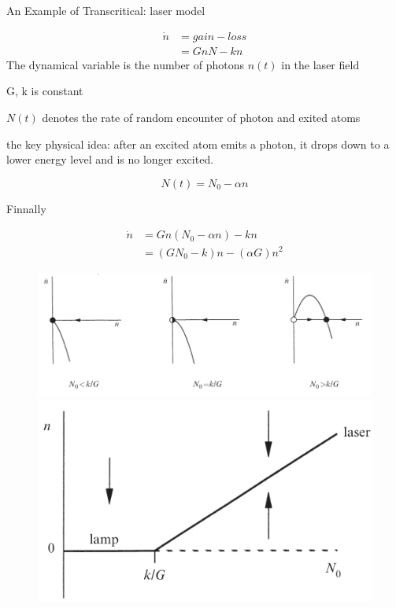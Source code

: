 \documentclass[9pt,aspectratio=43,mathserif,table]{beamer}
\begin{document}
\begin{frame}{An Example of Transcritical: laser model}

  \begin{multicols}{2}
    \begin{equation}
      \begin{aligned}
        \dot n &= gain - loss \\
               &= GnN - kn 
      \end{aligned}
    \end{equation}
    The dynamical variable is the number of photons $n ( t )$ in the laser field

    G, k is constant

    $N(t)$ denotes the rate of random encounter of photon and exited atoms

    the key physical idea: after an excited atom emits a photon, it
    drops down to a lower energy level and is no longer excited. 

    $$N(t) = N_0 - \alpha n$$

    Finnally 

    \begin{equation}
      \begin{aligned}
        \dot n &= Gn(N_0 - \alpha n) - k n \\
               &= (GN_0 - k) n - (\alpha G) n^2
      \end{aligned}
    \end{equation}

  \end{multicols}
    \begin{figure}[!h]
      \centering
      \includegraphics[width=.4\textwidth]{fig/laser_transcritical.png}
      \includegraphics[width=.2\textwidth]{fig/laser_transcritical_bifurcation.png}
    \end{figure}
 
\end{frame}
\end{document}
